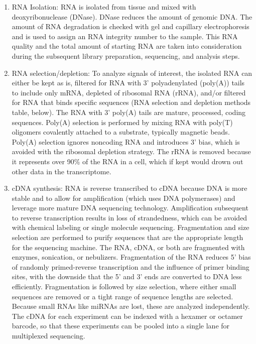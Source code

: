 \begin{enumerate}
\def\labelenumi{\arabic{enumi}.}
\tightlist
\item
  RNA Isolation: RNA is isolated from tissue and mixed with deoxyribonuclease (DNase). DNase reduces the amount of genomic DNA. The amount of RNA degradation is checked with gel and capillary electrophoresis and is used to assign an RNA integrity number to the sample. This RNA quality and the total amount of starting RNA are taken into consideration during the subsequent library preparation, sequencing, and analysis steps.
\item
  RNA selection/depletion: To analyze signals of interest, the isolated RNA can either be kept as is, filtered for RNA with 3' polyadenylated (poly(A)) tails to include only mRNA, depleted of ribosomal RNA (rRNA), and/or filtered for RNA that binds specific sequences (RNA selection and depletion methods table, below). The RNA with 3' poly(A) tails are mature, processed, coding sequences. Poly(A) selection is performed by mixing RNA with poly(T) oligomers covalently attached to a substrate, typically magnetic beads. Poly(A) selection ignores noncoding RNA and introduces 3' bias, which is avoided with the ribosomal depletion strategy. The rRNA is removed because it represents over 90\% of the RNA in a cell, which if kept would drown out other data in the transcriptome.
\item
  cDNA synthesis: RNA is reverse transcribed to cDNA because DNA is more stable and to allow for amplification (which uses DNA polymerases) and leverage more mature DNA sequencing technology. Amplification subsequent to reverse transcription results in loss of strandedness, which can be avoided with chemical labeling or single molecule sequencing. Fragmentation and size selection are performed to purify sequences that are the appropriate length for the sequencing machine. The RNA, cDNA, or both are fragmented with enzymes, sonication, or nebulizers. Fragmentation of the RNA reduces 5' bias of randomly primed-reverse transcription and the influence of primer binding sites, with the downside that the 5' and 3' ends are converted to DNA less efficiently. Fragmentation is followed by size selection, where either small sequences are removed or a tight range of sequence lengths are selected. Because small RNAs like miRNAs are lost, these are analyzed independently. The cDNA for each experiment can be indexed with a hexamer or octamer barcode, so that these experiments can be pooled into a single lane for multiplexed sequencing.
\end{enumerate}


